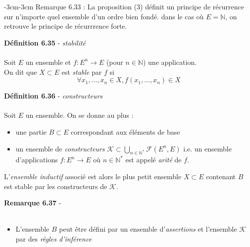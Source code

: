 \documentclass{article}
\newcommand{\notion}[1]{\textcolor{vert_fonce}{\textit{#1}}}
\newenvironment{definition}[2]
{
    \begin{boite_definition}
    \textbf{\textcolor{rouge_fonce}{Définition #1}} - \textit{#2} \\ \\
}
{
    \end{boite_definition}
    \vspace{15pt}
}
\newenvironment{exemples}[2]
{
    \begin{boite_exemples}
    \textbf{\textcolor{bleu_fonce}{Exemples #1}} - \textit{#2} \\
    \begin{itemize}[label=$\blacktriangleright \quad $]                    
}
{   
    \end{itemize}
    \end{boite_exemples}
    \vspace{15pt}
}
\newenvironment{remarque}[2]
{
    \begin{boite_remarque}
    \textbf{\textcolor{bleu_fonce}{Remarque #1}} - \textit{#2} \\ \\
    \begin{itemize}[label=$\blacktriangleright \quad $ ]                    
}
{   
    \end{itemize}
    \end{boite_remarque}
    
}
\begin{document}
\begin{adjustwidth}{-3cm}{-3cm}
        Remarque 6.33 : 
        La proposition (3) définit un principe de récurrence sur n'importe quel ensemble d'un ordre bien fondé. dans le cas où $E = \mathbb{N}$, on retrouve le principe de récurrrence forte.

                

        \begin{definition}{6.35}{stabilité}
            Soit $E$ un ensemble et $f:E^n \rightarrow E$ (pour $n \in \mathbb{N}$) une application. \\ On dit que $X \subset E$ est \notion{stable} par $f$ si $$ \forall x_1,\ldots,x_n \in X, f(x_1,\ldots,x_n) \in X$$
        \end{definition}

        \begin{definition}{6.36}{constructeurs}
            Soit $E$ un ensemble. On se donne au plus :  \begin{itemize}
                \item une partie $B \subset E$ correspondant aux éléments de base
                \item un ensemble de \notion{constructeurs} $\mathcal{K} \subset \bigcup_{n \in \mathbb{N}^*} \mathcal{F}(E^n,E)$ i.e. un ensemble d'applications $f:E^n \rightarrow E$
                où $n \in \mathbb{N}^*$ est appelé \notion{arité} de $f$.
            \end{itemize}
        L'\notion{ensemble inductif} associé est alors le plus petit ensemble $X \subset E$ contenant $B$ est stable par les constructeurs de $\mathcal{K}$.
        \end{definition}

        \begin{remarque}{6.37}{}
            \item L'ensemble $B$ peut être défini par un ensemble d'\notion{assertions} et l'ensemble $\mathcal{K}$ par des \notion{règles d'inférence}
        \end{remarque}


\end{adjustwidth}
\end{document}
